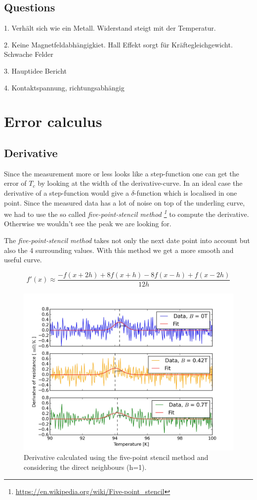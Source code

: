 \documentclass[a4paper,parskip,11pt, DIV12]{scrreprt}
\begin{document}
\section{Questions}

1. Verhält sich wie ein Metall. Widerstand steigt mit der Temperatur.

2. Keine Magnetfeldabhängigkiet. Hall Effekt sorgt für Kräftegleichgewicht. Schwache Felder

3. Hauptidee Bericht

4. Kontaktspannung, richtungsabhängig


\chapter{Error calculus}


\section{Derivative}

Since the measurement more or less looks like a step-function one can get the error of $T_{c}$ by looking at the width of the derivative-curve. In an ideal case the derivative of a step-function would give a $\delta$-function which is localised in one point. Since the measured data has a lot of noise on top of the underling curve, we had to use the so called \emph{five-point-stencil method \footnote{\url{https://en.wikipedia.org/wiki/Five-point_stencil}}} to compute the derivative. Otherwise we wouldn't see the peak we are looking for. 

The \emph{five-point-stencil method} takes not only the next date point into account but also the 4 surrounding values. With this method we get a more smooth and useful curve. 

$$f'(x) \approx \frac{-f(x+2 h)+8 f(x+h)-8 f(x-h)+f(x-2h)}{12 h}$$

\begin{figure}[H]
\centering
\includegraphics[scale=0.11]{Criticaltemperature3}
\caption[]{Derivative calculated using the five-point stencil method and considering the direct neighbours (h=1).  }
\end{figure}
\end{document}

